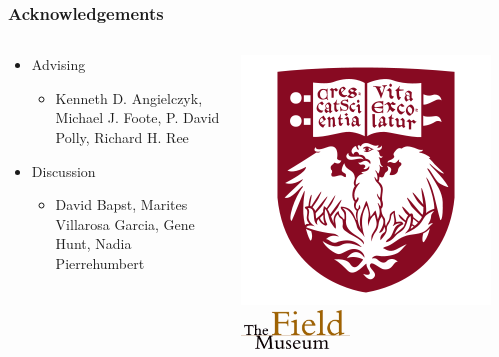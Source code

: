 \documentclass{beamer}
\begin{document}
\begin{frame}
  \frametitle{Acknowledgements}
  \begin{columns}
    \begin{column}{0.4\textwidth}
      \begin{itemize}
        \item Advising
          \begin{itemize}
            \item Kenneth D. Angielczyk, Michael J. Foote, P. David Polly, Richard H. Ree
          \end{itemize}

        \item Discussion 
          \begin{itemize}
            \item David Bapst, Marites Villarosa Garcia, Gene Hunt, Nadia Pierrehumbert
          \end{itemize}
      \end{itemize}
    \end{column}
    \begin{column}{0.6\textwidth}
      \includegraphics[height = 0.3\textheight, keepaspectratio = true]{figure/chicago} 
      \includegraphics[width = 0.4\textwidth, keepaspectratio = true]{figure/field}


\end{column}
\end{columns}
\end{frame}
\end{document}
